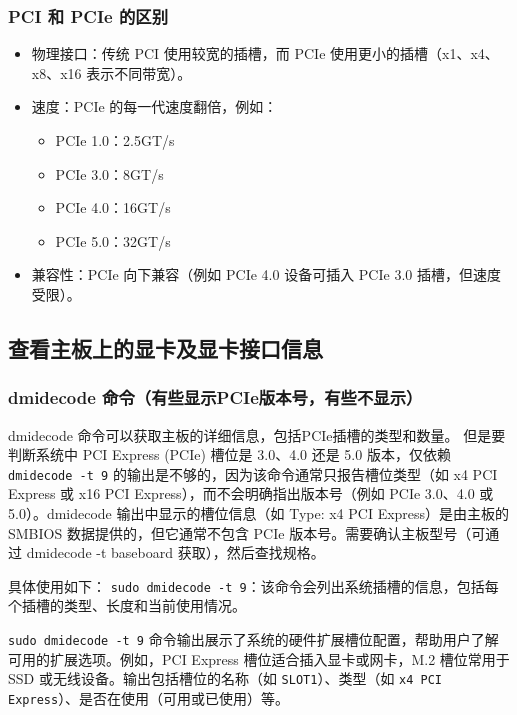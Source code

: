 \subsubsection{PCI 和 PCIe 的区别}
\begin{itemize}
\item 物理接口：传统 PCI 使用较宽的插槽，而 PCIe 使用更小的插槽（x1、x4、x8、x16 表示不同带宽）。

\item 速度：PCIe 的每一代速度翻倍，例如：
\begin{itemize}
\item PCIe 1.0：2.5GT/s
\item PCIe 3.0：8GT/s
\item PCIe 4.0：16GT/s
\item PCIe 5.0：32GT/s
\end{itemize}

\item 兼容性：PCIe 向下兼容（例如 PCIe 4.0 设备可插入 PCIe 3.0 插槽，但速度受限）。
\end{itemize}



\subsection{查看主板上的显卡及显卡接口信息}
\subsubsection{dmidecode 命令（有些显示PCIe版本号，有些不显示）}
dmidecode 命令可以获取主板的详细信息，包括PCIe插槽的类型和数量。
但是要判断系统中 PCI Express (PCIe) 槽位是 3.0、4.0 还是 5.0 版本，仅依赖 \verb|dmidecode -t 9| 的输出是不够的，因为该命令通常只报告槽位类型（如 x4 PCI Express 或 x16 PCI Express），而不会明确指出版本号（例如 PCIe 3.0、4.0 或 5.0）。dmidecode 输出中显示的槽位信息（如 Type: x4 PCI Express）是由主板的 SMBIOS 数据提供的，但它通常不包含 PCIe 版本号。需要确认主板型号（可通过 dmidecode -t baseboard 获取），然后查找规格。


具体使用如下：
\verb|sudo dmidecode -t 9|：该命令会列出系统插槽的信息，包括每个插槽的类型、长度和当前使用情况。

\texttt{sudo dmidecode -t 9} 命令输出展示了系统的硬件扩展槽位配置，帮助用户了解可用的扩展选项。例如，PCI Express 槽位适合插入显卡或网卡，M.2 槽位常用于 SSD 或无线设备。输出包括槽位的名称（如 \texttt{SLOT1}）、类型（如 \texttt{x4 PCI Express}）、是否在使用（可用或已使用）等。

